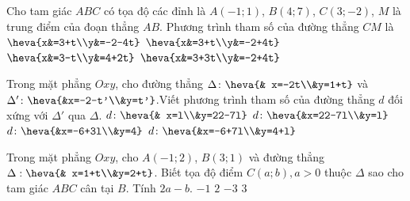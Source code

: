 \begin{ex}%
	Cho tam giác $ABC$ có tọa độ các đỉnh là $A(-1;1)$, $B(4;7)$, $C(3;-2)$, $M$ là trung điểm của đoạn thẳng $AB$. Phương trình tham số của đường thẳng $CM$ là
	\choice
	{\True $\heva{x&=3+t\\y&=-2-4t}$}
	{$\heva{x&=3+t\\y&=-2+4t}$}
	{$\heva{x&=3-t\\y&=4+2t}$}
	{$\heva{x&=3+3t\\y&=-2+4t}$}
\end{ex}
\begin{ex}%
	Trong mặt phẳng $Oxy$, cho đường thẳng $\Delta\colon \heva{& x=-2t\\&y=1+t}$ và $\Delta'\colon \heva{&x=-2-t'\\&y=t'}$.Viết phương trình tham số của đường thẳng $d$ đối xứng với $\Delta'$ qua $\Delta$. \choice
	{$d\colon \heva{& x=l\\&y=22-7l}$}
	{\True $d\colon \heva{&x=22-7l\\&y=l}$}
	{$d\colon \heva{&x=-6+3l\\&y=4}$}
	{$d\colon \heva{&x=-6+7l\\&y=4+l}$}
\end{ex}
\begin{ex}%
	Trong mặt phẳng $Oxy$, cho $A(-1;2)$, $B(3;1)$ và đường thẳng $\Delta: \heva{& x=1+t\\&y=2+t}$. Biết tọa độ điểm $C(a; b), a>0$ thuộc $\Delta$ sao cho tam giác $ABC$ cân tại $B$. Tính $2a -b$.\choice
	{$-1$}
	{$2$}
	{\True$-3$}
	{$3$}
\end{ex}
